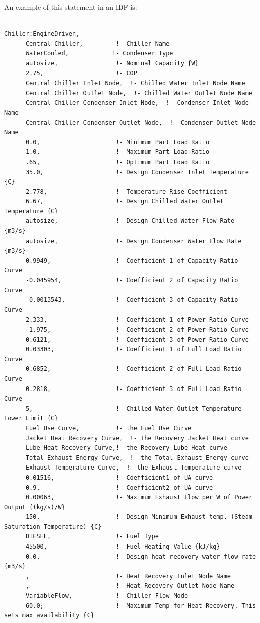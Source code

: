 An example of this statement in an IDF is:

\begin{lstlisting}

Chiller:EngineDriven,
      Central Chiller,         !- Chiller Name
      WaterCooled,            !- Condenser Type
      autosize,                !- Nominal Capacity {W}
      2.75,                    !- COP
      Central Chiller Inlet Node,  !- Chilled Water Inlet Node Name
      Central Chiller Outlet Node,  !- Chilled Water Outlet Node Name
      Central Chiller Condenser Inlet Node,  !- Condenser Inlet Node Name
      Central Chiller Condenser Outlet Node,  !- Condenser Outlet Node Name
      0.0,                     !- Minimum Part Load Ratio
      1.0,                     !- Maximum Part Load Ratio
      .65,                     !- Optimum Part Load Ratio
      35.0,                    !- Design Condenser Inlet Temperature {C}
      2.778,                   !- Temperature Rise Coefficient
      6.67,                    !- Design Chilled Water Outlet Temperature {C}
      autosize,                !- Design Chilled Water Flow Rate {m3/s}
      autosize,                !- Design Condenser Water Flow Rate {m3/s}
      0.9949,                  !- Coefficient 1 of Capacity Ratio Curve
      -0.045954,               !- Coefficient 2 of Capacity Ratio Curve
      -0.0013543,              !- Coefficient 3 of Capacity Ratio Curve
      2.333,                   !- Coefficient 1 of Power Ratio Curve
      -1.975,                  !- Coefficient 2 of Power Ratio Curve
      0.6121,                  !- Coefficient 3 of Power Ratio Curve
      0.03303,                 !- Coefficient 1 of Full Load Ratio Curve
      0.6852,                  !- Coefficient 2 of Full Load Ratio Curve
      0.2818,                  !- Coefficient 3 of Full Load Ratio Curve
      5,                       !- Chilled Water Outlet Temperature Lower Limit {C}
      Fuel Use Curve,          !- the Fuel Use Curve
      Jacket Heat Recovery Curve,  !- the Recovery Jacket Heat curve
      Lube Heat Recovery Curve,!- the Recovery Lube Heat curve
      Total Exhaust Energy Curve,  !- the Total Exhaust Energy curve
      Exhaust Temperature Curve,  !- the Exhaust Temperature curve
      0.01516,                 !- Coefficient1 of UA curve
      0.9,                     !- Coefficient2 of UA curve
      0.00063,                 !- Maximum Exhaust Flow per W of Power Output {(kg/s)/W}
      150,                     !- Design Minimum Exhaust temp. (Steam Saturation Temperature) {C}
      DIESEL,                  !- Fuel Type
      45500,                   !- Fuel Heating Value {kJ/kg}
      0.0,                     !- Design heat recovery water flow rate {m3/s}
      ,                        !- Heat Recovery Inlet Node Name
      ,                        !- Heat Recovery Outlet Node Name
      VariableFlow,            !- Chiller Flow Mode
      60.0;                    !- Maximum Temp for Heat Recovery. This sets max availability {C}
\end{lstlisting}

